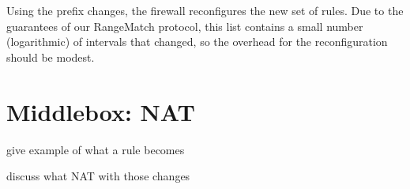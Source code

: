 Using the prefix changes, the firewall 
 reconfigures the new set of rules. Due to the guarantees of our RangeMatch protocol, this list contains a 
small number (logarithmic) of intervals that changed, so the overhead for the reconfiguration should be modest.




\section{Middlebox: NAT}\label{sec:nat}

give example of what a rule becomes

discuss what NAT with those changes 
